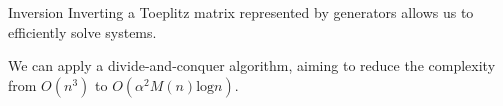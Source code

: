 \begin{frame}{Inversion}
  Inverting a Toeplitz matrix represented by generators allows us to
  efficiently solve systems.

  We can apply a divide-and-conquer algorithm, aiming to reduce the
  complexity from $O(n^3)$ to $O(\alpha^{2} M(n) \text{log} n)$.
\end{frame}
